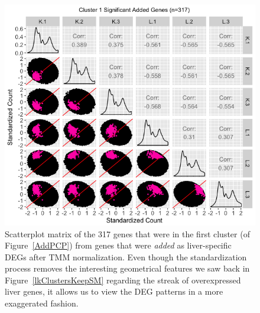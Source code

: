 \documentclass{article}
\begin{document}
\null
\begin{figure}[t!]
\centerline{\includegraphics[width=1\columnwidth]{../MakeFigures/lkClustersAddSM-St.jpg}}
\caption{Scatterplot matrix of the 317 genes that were in the first cluster (of Figure~\ref{AddPCP}) from genes that were \textit{added} as liver-specific DEGs after TMM normalization. Even though the standardization process removes the interesting geometrical features we saw back in Figure~\ref{lkClustersKeepSM} regarding the streak of overexpressed liver genes, it allows us to view the DEG patterns in a more exaggerated fashion.
\label{lkClustersAddSM-St}}
\end{figure}
\end{document}
